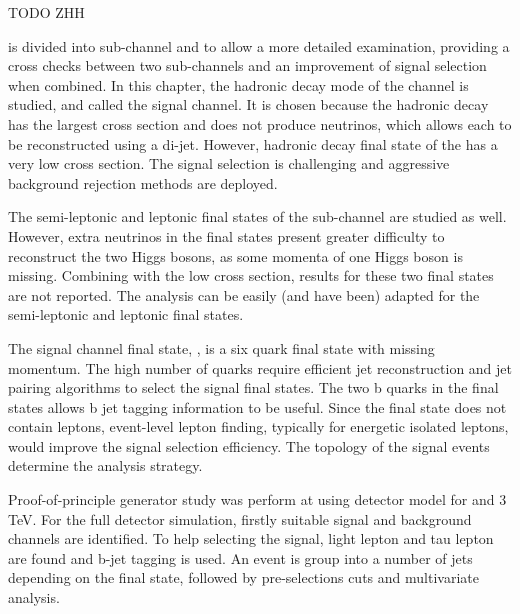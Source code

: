 TODO
ZHH


\eeToHH is divided into sub-channel \eeToHHbbWW and \eeToHHbbbb to allow a more detailed examination, providing a cross checks between two sub-channels and an improvement of signal selection when combined. In this chapter, the \PW hadronic decay mode of the \eeToHHbbWW channel is studied, and called the signal channel. It is chosen because the hadronic decay has the largest cross section and does not produce neutrinos, which allows each \PW to be reconstructed using a di-jet. However, hadronic decay final state of the \eeToHHbbWW has a very low cross section. The signal selection is challenging and aggressive background rejection methods are deployed.

The semi-leptonic and leptonic final states of the  sub-channel \eeToHHbbWW are studied as well. However, extra neutrinos in the final states present greater difficulty to reconstruct the two Higgs bosons, as some momenta of one Higgs boson is missing. Combining with the low cross section, results for these two final states are not reported. The analysis can be easily (and have been) adapted for the semi-leptonic and leptonic final states.

The signal channel final state, \eeToHHbbWWHadFull, is a six quark final state with missing momentum. The high number of quarks require efficient jet reconstruction and jet pairing algorithms to select the signal final states. The two b quarks in the final states allows b jet tagging information to be useful. Since the final state does not contain leptons, event-level lepton finding, typically for energetic isolated leptons,  would improve the signal selection efficiency. The topology of the signal events determine the analysis strategy.

Proof-of-principle generator study was perform at \CLIC using \CLICILD detector model for  and 3\,TeV\cite{Linssen:2012hp}. For the full \CLICILD detector simulation, firstly suitable signal and background channels are identified. To help selecting the signal, light lepton and tau lepton are found and b-jet tagging is used. An event is group into a number of jets depending on the final state, followed by pre-selections cuts and multivariate analysis.


